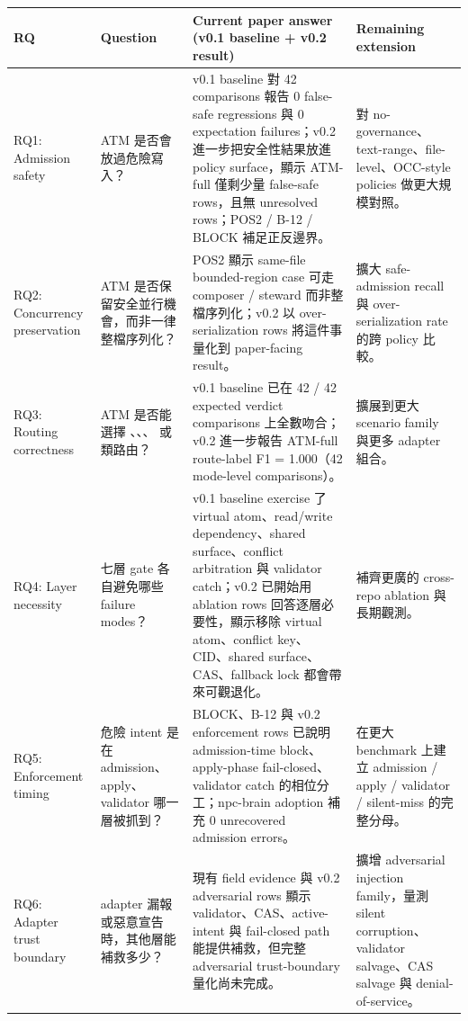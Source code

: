 \documentclass[a4paper,fontset=none]{ctexart}
\begin{document}
\begingroup
\footnotesize
{}
\begin{longtable}{L{0.23\textwidth}L{0.23\textwidth}L{0.23\textwidth}L{0.23\textwidth}}
\toprule
RQ & Question & Current paper answer (v0.1 baseline + v0.2 result) & Remaining extension \\
\midrule
RQ1: Admission safety & ATM 是否會放過危險寫入？ & v0.1 baseline 對 42 comparisons 報告 0 false-safe regressions 與 0 expectation failures；v0.2 進一步把安全性結果放進 policy surface，顯示 ATM-full 僅剩少量 false-safe rows，且無 unresolved rows；POS2 / B-12 / BLOCK 補足正反邊界。 & 對 no-governance、text-range、file-level、OCC-style policies 做更大規模對照。 \\
RQ2: Concurrency preservation & ATM 是否保留安全並行機會，而非一律整檔序列化？ & POS2 顯示 same-file bounded-region case 可走 composer / steward 而非整檔序列化；v0.2 以 over-serialization rows 將這件事量化到 paper-facing result。 & 擴大 safe-admission recall 與 over-serialization rate 的跨 policy 比較。 \\
RQ3: Routing correctness & ATM 是否能選擇 \texttt{}、\texttt{}、\texttt{}、\texttt{} 或 \texttt{} 類路由？ & v0.1 baseline 已在 42 / 42 expected verdict comparisons 上全數吻合；v0.2 進一步報告 ATM-full route-label F1 = 1.000（42 mode-level comparisons）。 & 擴展到更大 scenario family 與更多 adapter 組合。 \\
RQ4: Layer necessity & 七層 gate 各自避免哪些 failure modes？ & v0.1 baseline exercise 了 virtual atom、read/write dependency、shared surface、conflict arbitration 與 validator catch；v0.2 已開始用 ablation rows 回答逐層必要性，顯示移除 virtual atom、conflict key、CID、shared surface、CAS、fallback lock 都會帶來可觀退化。 & 補齊更廣的 cross-repo ablation 與長期觀測。 \\
RQ5: Enforcement timing & 危險 intent 是在 admission、apply、validator 哪一層被抓到？ & BLOCK、B-12 與 v0.2 enforcement rows 已說明 admission-time block、apply-phase fail-closed、validator catch 的相位分工；npc-brain adoption 補充 0 unrecovered admission errors。 & 在更大 benchmark 上建立 admission / apply / validator / silent-miss 的完整分母。 \\
RQ6: Adapter trust boundary & adapter 漏報或惡意宣告時，其他層能補救多少？ & 現有 field evidence 與 v0.2 adversarial rows 顯示 validator、CAS、active-intent 與 fail-closed path 能提供補救，但完整 adversarial trust-boundary 量化尚未完成。 & 擴增 adversarial injection family，量測 silent corruption、validator salvage、CAS salvage 與 denial-of-service。 \\
\bottomrule
\end{longtable}
\endgroup
\end{document}
